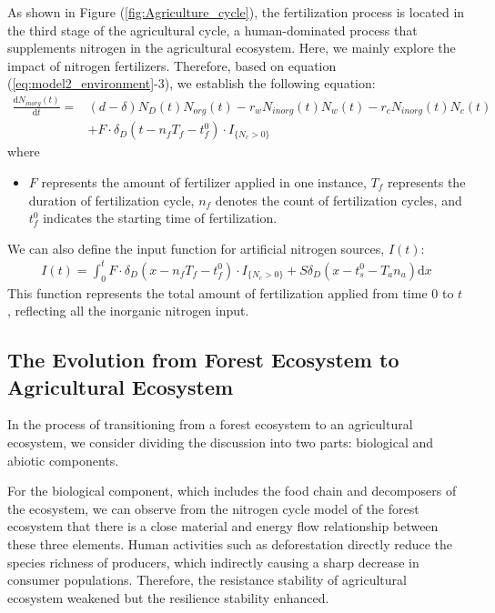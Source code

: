 \documentclass{mcmthesis}
\begin{document}
As shown in Figure (\ref{fig:Agriculture_cycle}), the fertilization process is located in the third stage of the agricultural cycle, a human-dominated process that supplements nitrogen in the agricultural ecosystem. Here, we mainly explore the impact of nitrogen fertilizers. Therefore, based on equation (\ref{eq:model2_environment}-3), we establish the following equation:
\begin{align}  
\frac{\mathrm{d}N_{inorg}(t)}{\mathrm{d}t} =&  \left( d - \delta \right) N_D(t) N_{org}(t) - r_w N_{inorg}(t) N_w(t) - r_c N_{inorg}(t) N_c(t) \nonumber\\  
&+\boxed{F \cdot \delta_D\left(t-n_fT_f-t_{f}^{0} \right) \cdot I_{\{N_c > 0\}}}  
\label{eq:model2_fertilize}  
\end{align}  
where
\begin{itemize}  
    \item $F$ represents the amount of fertilizer applied in one instance, $T_f$ represents the duration of fertilization cycle, $n_f$ denotes the count of fertilization cycles, and $t_{f}^{0}$ indicates the starting time of fertilization.  
\end{itemize}  

We can also define the input function for artificial nitrogen sources, $I(t)$:  
\begin{align}  
    I(t) = \int_0^t F \cdot \delta_D\left(x-n_fT_f-t_{f}^{0} \right) \cdot I_{\{N_c > 0\}}  + S\delta _D\left( x-t_{s}^{0}-T_an_a \right)\mathrm{d}x  
    \label{eq:input_function}  
\end{align}  
This function represents the total amount of fertilization applied from time 0 to $t$, reflecting all the inorganic nitrogen input.  

\subsection{The Evolution from Forest Ecosystem to Agricultural Ecosystem}  
In the process of transitioning from a forest ecosystem to an agricultural ecosystem, we consider dividing the discussion into two parts: biological and abiotic components.  

For the biological component, which includes the food chain and decomposers of the ecosystem, we can observe from the nitrogen cycle model of the forest ecosystem that there is a close material and energy flow relationship between these three elements. Human activities such as deforestation directly reduce the species richness of producers, which indirectly causing a sharp decrease in consumer populations. Therefore, the resistance stability of agricultural ecosystem weakened but the resilience stability enhanced.  
\end{document}
